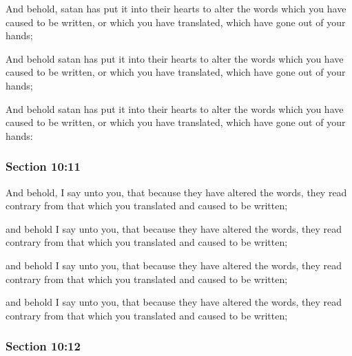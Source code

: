 		\begin{framed}
		\scriptsize
			\begin{compactdesc}
				\item[JSP] And behold, satan has put it into their hearts to alter the words which you have caused to be written, or which you have translated, which have gone out of your hands;
				\item[RB1] [\textit{missing}] 
				\item[DC 1835] And behold satan has put it into their hearts to alter the words which you have caused to be written, or which you have translated, which have gone out of your hands;
				\item[DC 1844] And behold satan has put it into their hearts to alter the words which you have caused to be written, or which you have translated, which have gone out of your hands:
			\end{compactdesc}
		\end{framed}

	\subsubsection{Section 10:11} %
		\label{DC10-11}

		And behold, I say unto you, that because they have altered the words, they read contrary from that which you translated and caused to be written;

		\begin{framed}
		\scriptsize
			\begin{compactdesc}
				\item[JSP] and behold I say unto you, that because they have altered the words, they read contrary from that which you translated and caused to be written;
				\item[RB1] [\textit{missing}] 
				\item[DC 1835] and behold I say unto you, that because they have altered the words, they read contrary from that which you translated and caused to be written;
				\item[DC 1844] and behold I say unto you, that because they have altered the words, they read contrary from that which you translated and caused to be written;
			\end{compactdesc}
		\end{framed}

	\subsubsection{Section 10:12} %
		\label{DC10-12}

